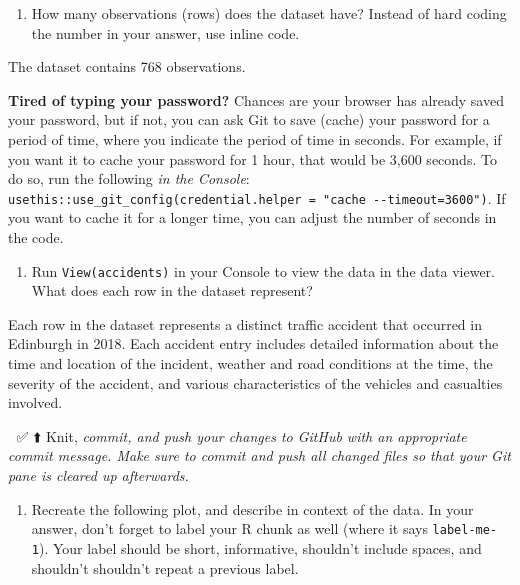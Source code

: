 \documentclass[
]{article}
\providecommand{\tightlist}{%
  \setlength{\itemsep}{0pt}\setlength{\parskip}{0pt}}
\begin{document}
\begin{enumerate}
\def\labelenumi{\arabic{enumi}.}
\tightlist
\item
  How many observations (rows) does the dataset have? Instead of hard
  coding the number in your answer, use inline code.
\end{enumerate}

The dataset contains 768 observations.

\textbf{Tired of typing your password?} Chances are your browser has
already saved your password, but if not, you can ask Git to save (cache)
your password for a period of time, where you indicate the period of
time in seconds. For example, if you want it to cache your password for
1 hour, that would be 3,600 seconds. To do so, run the following
\emph{in the Console}:
\texttt{usethis::use\_git\_config(credential.helper\ =\ "cache\ -\/-timeout=3600")}.
If you want to cache it for a longer time, you can adjust the number of
seconds in the code.

\begin{enumerate}
\def\labelenumi{\arabic{enumi}.}
\setcounter{enumi}{1}
\tightlist
\item
  Run \texttt{View(accidents)} in your Console to view the data in the
  data viewer. What does each row in the dataset represent?
\end{enumerate}

Each row in the dataset represents a distinct traffic accident that
occurred in Edinburgh in 2018. Each accident entry includes detailed
information about the time and location of the incident, weather and
road conditions at the time, the severity of the accident, and various
characteristics of the vehicles and casualties involved.

🧶 ✅ ⬆️ Knit, \emph{commit, and push your changes to GitHub with an
appropriate commit message. Make sure to commit and push all changed
files so that your Git pane is cleared up afterwards.}

\begin{enumerate}
\def\labelenumi{\arabic{enumi}.}
\setcounter{enumi}{2}
\tightlist
\item
  Recreate the following plot, and describe in context of the data. In
  your answer, don't forget to label your R chunk as well (where it says
  \texttt{label-me-1}). Your label should be short, informative,
  shouldn't include spaces, and shouldn't shouldn't repeat a previous
  label.
\end{enumerate}
\end{document}
